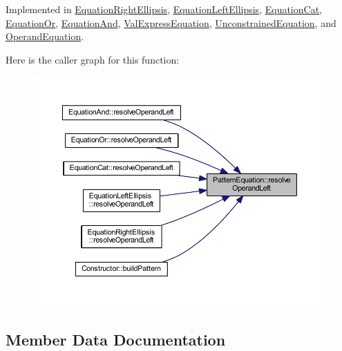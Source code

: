 Implemented in \mbox{\hyperlink{class_equation_right_ellipsis_aa6d5d32c1f6da5d4ecffe983221d1497}{Equation\+Right\+Ellipsis}}, \mbox{\hyperlink{class_equation_left_ellipsis_a91c58188530288eff1690528aff67c72}{Equation\+Left\+Ellipsis}}, \mbox{\hyperlink{class_equation_cat_a1c2557c53605b96ab6888ea55d8f5964}{Equation\+Cat}}, \mbox{\hyperlink{class_equation_or_adcdf8650d37644bf0e43a9a0c38ddd7c}{Equation\+Or}}, \mbox{\hyperlink{class_equation_and_a794c3ebf0951a854cdd31b99cce09937}{Equation\+And}}, \mbox{\hyperlink{class_val_express_equation_ad13fa9a79e7ff80ed63b0c0e12f395ab}{Val\+Express\+Equation}}, \mbox{\hyperlink{class_unconstrained_equation_a9970189fd95bdb8ce0c30da626124510}{Unconstrained\+Equation}}, and \mbox{\hyperlink{class_operand_equation_a2a36915c92d63ee68c503a33daa79eda}{Operand\+Equation}}.

Here is the caller graph for this function\+:
\nopagebreak
\begin{figure}[H]
\begin{center}
\leavevmode
\includegraphics[width=350pt]{class_pattern_equation_a16e885a945df91e3daf2dea6394ae6f2_icgraph}
\end{center}
\end{figure}


\subsection{Member Data Documentation}
\mbox{\label{class_pattern_equation_a1ee30230dcc5e8a9afbb2021e4286986}} 
